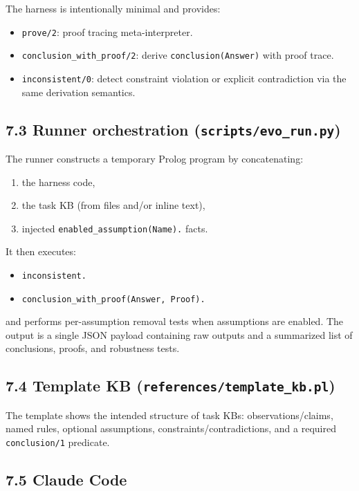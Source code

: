 \documentclass[12pt,a4paper]{article}
\begin{document}
The harness is intentionally minimal and provides:
\begin{itemize}[leftmargin=*,topsep=2pt,itemsep=2pt]
\item \texttt{prove/2}: proof tracing meta-interpreter.
\item \texttt{conclusion\_with\_proof/2}: derive \texttt{conclusion(Answer)} with proof trace.
\item \texttt{inconsistent/0}: detect constraint violation or explicit contradiction via the same derivation semantics.
\end{itemize}

\subsection{7.3 Runner orchestration (\texttt{scripts/evo\_run.py})}

The runner constructs a temporary Prolog program by concatenating:
\begin{enumerate}[leftmargin=*,topsep=2pt,itemsep=2pt]
\item the harness code,
\item the task KB (from files and/or inline text),
\item injected \texttt{enabled\_assumption(Name).} facts.
\end{enumerate}

It then executes:
\begin{itemize}[leftmargin=*,topsep=2pt,itemsep=2pt]
\item \texttt{inconsistent.}
\item \texttt{conclusion\_with\_proof(Answer, Proof).}
\end{itemize}

and performs per-assumption removal tests when assumptions are enabled. The output is a single JSON payload containing raw outputs and a summarized list of conclusions, proofs, and robustness tests.

\subsection{7.4 Template KB (\texttt{references/template\_kb.pl})}

The template shows the intended structure of task KBs: observations/claims, named rules, optional assumptions, constraints/contradictions, and a required \texttt{conclusion/1} predicate.

\subsection{7.5 Claude Code}
\end{document}
